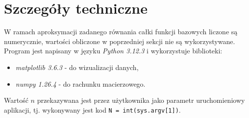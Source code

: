 \documentclass[a4paper,12pt]{article}
\begin{document}
    \section{Szczegóły techniczne}
    W ramach aproksymacji zadanego równania całki funkcji bazowych liczone są numerycznie, wartości obliczone w poprzedniej sekcji nie są wykorzystywane.
    Program jest napisany w języku \textit{Python 3.12.3} i wykorzystuje biblioteki:
    \begin{itemize}
        \item \textit{matplotlib 3.6.3} - do wizualizacji danych,
        \item \textit{numpy 1.26.4} - do rachunku macierzowego.
    \end{itemize}
    Wartość \(n\) przekazywana jest przez użytkownika jako parametr uruchomieniowy aplikacji, tj. wykonywany jest kod \lstinline{N = int(sys.argv[1])}.
\end{document}
